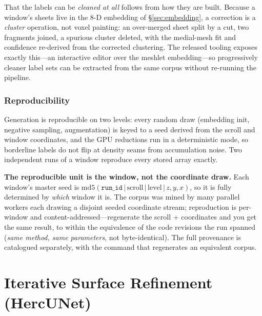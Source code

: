 \documentclass[10pt,twocolumn,a4paper]{article}
\newcommand{\code}[1]{\texttt{#1}}
\begin{document}
That the labels can be \emph{cleaned at all} follows from how they are built.
Because a window's sheets live in the 8-D embedding of \S\ref{sec:embedding}, a
correction is a \emph{cluster} operation, not voxel painting: an over-merged sheet
split by a cut, two fragments joined, a spurious cluster deleted, with the
medial-mesh fit and confidence re-derived from the corrected clustering. The
released tooling exposes exactly this---an interactive editor over the meshlet
embedding---so progressively cleaner label sets can be extracted from the same
corpus without re-running the pipeline.

\section{Reproducibility}
Generation is reproducible on two levels: every random draw (embedding init,
negative sampling, augmentation) is keyed to a seed derived from the scroll and
window coordinates, and the GPU reductions run in a deterministic mode, so
borderline labels do not flip at density seams from accumulation noise. Two
independent runs of a window reproduce every stored array exactly.

\textbf{The reproducible unit is the window, not the coordinate draw.} Each
window's master seed is
$\mathrm{md5}(\code{run\_id}\,|\,\text{scroll}\,|\,\text{level}\,|\,z,y,x)$, so it
is fully determined by \emph{which} window it is. The corpus was mined by many
parallel workers each drawing a disjoint seeded coordinate stream; reproduction is
per-window and content-addressed---regenerate the scroll + coordinates and you get
the same result, to within the equivalence of the code revisions the run spanned
(\emph{same method, same parameters}, not byte-identical). The full provenance is
catalogued separately, with the command that regenerates an equivalent corpus.

\part{Iterative Surface Refinement (HercUNet)}
\label{part:refiner}
\end{document}
